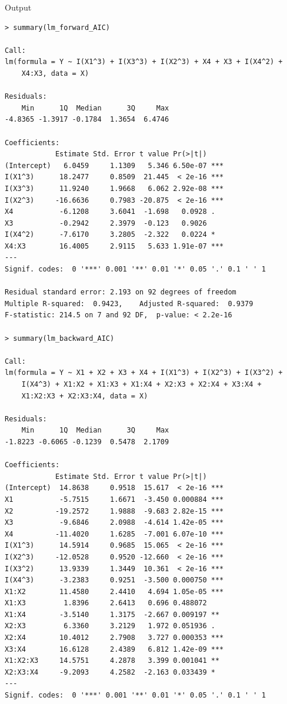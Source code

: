 Output
\begin{lstlisting}[style=output,basicstyle=\tiny]
> summary(lm_forward_AIC)

Call:
lm(formula = Y ~ I(X1^3) + I(X3^3) + I(X2^3) + X4 + X3 + I(X4^2) + 
    X4:X3, data = X)

Residuals:
    Min      1Q  Median      3Q     Max 
-4.8365 -1.3917 -0.1784  1.3654  6.4746 

Coefficients:
            Estimate Std. Error t value Pr(>|t|)    
(Intercept)   6.0459     1.1309   5.346 6.50e-07 ***
I(X1^3)      18.2477     0.8509  21.445  < 2e-16 ***
I(X3^3)      11.9240     1.9668   6.062 2.92e-08 ***
I(X2^3)     -16.6636     0.7983 -20.875  < 2e-16 ***
X4           -6.1208     3.6041  -1.698   0.0928 .  
X3           -0.2942     2.3979  -0.123   0.9026    
I(X4^2)      -7.6170     3.2805  -2.322   0.0224 *  
X4:X3        16.4005     2.9115   5.633 1.91e-07 ***
---
Signif. codes:  0 '***' 0.001 '**' 0.01 '*' 0.05 '.' 0.1 ' ' 1

Residual standard error: 2.193 on 92 degrees of freedom
Multiple R-squared:  0.9423,	Adjusted R-squared:  0.9379 
F-statistic: 214.5 on 7 and 92 DF,  p-value: < 2.2e-16
 
> summary(lm_backward_AIC)

Call:
lm(formula = Y ~ X1 + X2 + X3 + X4 + I(X1^3) + I(X2^3) + I(X3^2) + 
    I(X4^3) + X1:X2 + X1:X3 + X1:X4 + X2:X3 + X2:X4 + X3:X4 + 
    X1:X2:X3 + X2:X3:X4, data = X)

Residuals:
    Min      1Q  Median      3Q     Max 
-1.8223 -0.6065 -0.1239  0.5478  2.1709 

Coefficients:
            Estimate Std. Error t value Pr(>|t|)    
(Intercept)  14.8638     0.9518  15.617  < 2e-16 ***
X1           -5.7515     1.6671  -3.450 0.000884 ***
X2          -19.2572     1.9888  -9.683 2.82e-15 ***
X3           -9.6846     2.0988  -4.614 1.42e-05 ***
X4          -11.4020     1.6285  -7.001 6.07e-10 ***
I(X1^3)      14.5914     0.9685  15.065  < 2e-16 ***
I(X2^3)     -12.0528     0.9520 -12.660  < 2e-16 ***
I(X3^2)      13.9339     1.3449  10.361  < 2e-16 ***
I(X4^3)      -3.2383     0.9251  -3.500 0.000750 ***
X1:X2        11.4580     2.4410   4.694 1.05e-05 ***
X1:X3         1.8396     2.6413   0.696 0.488072    
X1:X4        -3.5140     1.3175  -2.667 0.009197 ** 
X2:X3         6.3360     3.2129   1.972 0.051936 .  
X2:X4        10.4012     2.7908   3.727 0.000353 ***
X3:X4        16.6128     2.4389   6.812 1.42e-09 ***
X1:X2:X3     14.5751     4.2878   3.399 0.001041 ** 
X2:X3:X4     -9.2093     4.2582  -2.163 0.033439 *  
---
Signif. codes:  0 '***' 0.001 '**' 0.01 '*' 0.05 '.' 0.1 ' ' 1


\end{lstlisting}
